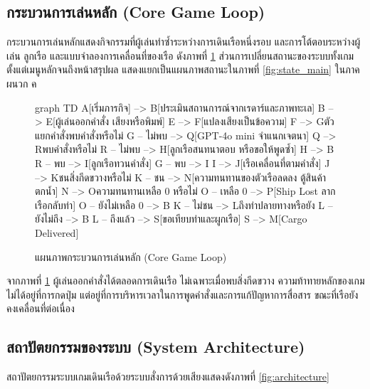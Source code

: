 \subsection{กระบวนการเล่นหลัก (Core Game Loop)}

กระบวนการเล่นหลักแสดงกิจกรรมที่ผู้เล่นทำซ้ำระหว่างการเดินเรือหนึ่งรอบ และการโต้ตอบระหว่างผู้เล่น ลูกเรือ และแบบจำลองการเคลื่อนที่ของเรือ ดังภาพที่ \ref{fig:gameloop} ส่วนการเปลี่ยนสถานะของระบบทั้งเกม ตั้งแต่เมนูหลักจนถึงหน้าสรุปผล แสดงแยกเป็นแผนภาพสถานะในภาพที่ \ref{fig:state_main} ในภาคผนวก ค

\begin{figure}[!htbp]
\centering
\begin{mermaid}
graph TD
    A[เริ่มภารกิจ] --> B[ประเมินสถานการณ์จากเรดาร์และภาพทะเล]
    B --> E[ผู้เล่นออกคำสั่ง เสียงหรือพิมพ์]
    E --> F[แปลงเสียงเป็นข้อความ]
    F --> G{ตัวแยกคำสั่งพบคำสั่งหรือไม่}
    G -- ไม่พบ --> Q[GPT-4o mini จำแนกเจตนา]
    Q --> R{พบคำสั่งหรือไม่}
    R -- ไม่พบ --> H[ลูกเรือสนทนาตอบ หรือขอให้พูดซ้ำ]
    H --> B
    R -- พบ --> I[ลูกเรือทวนคำสั่ง]
    G -- พบ --> I
    I --> J[เรือเคลื่อนที่ตามคำสั่ง]
    J --> K{ชนสิ่งกีดขวางหรือไม่}
    K -- ชน --> N[ความทนทานของตัวเรือลดลง ตู้สินค้าตกน้ำ]
    N --> O{ความทนทานเหลือ 0 หรือไม่}
    O -- เหลือ 0 --> P[Ship Lost ลากเรือกลับท่า]
    O -- ยังไม่เหลือ 0 --> B
    K -- ไม่ชน --> L{ถึงท่าปลายทางหรือยัง}
    L -- ยังไม่ถึง --> B
    L -- ถึงแล้ว --> S[ขอเทียบท่าและผูกเรือ]
    S --> M[Cargo Delivered]
\end{mermaid}
\caption{แผนภาพกระบวนการเล่นหลัก (Core Game Loop)}
\label{fig:gameloop}
\end{figure}

จากภาพที่ \ref{fig:gameloop} ผู้เล่นออกคำสั่งได้ตลอดการเดินเรือ ไม่เฉพาะเมื่อพบสิ่งกีดขวาง ความท้าทายหลักของเกมไม่ได้อยู่ที่การกดปุ่ม แต่อยู่ที่การบริหารเวลาในการพูดคำสั่งและการแก้ปัญหาการสื่อสาร ขณะที่เรือยังคงเคลื่อนที่ต่อเนื่อง

\subsection{สถาปัตยกรรมของระบบ (System Architecture)}

สถาปัตยกรรมระบบเกมเดินเรือด้วยระบบสั่งการด้วยเสียงแสดงดังภาพที่ \ref{fig:architecture}

